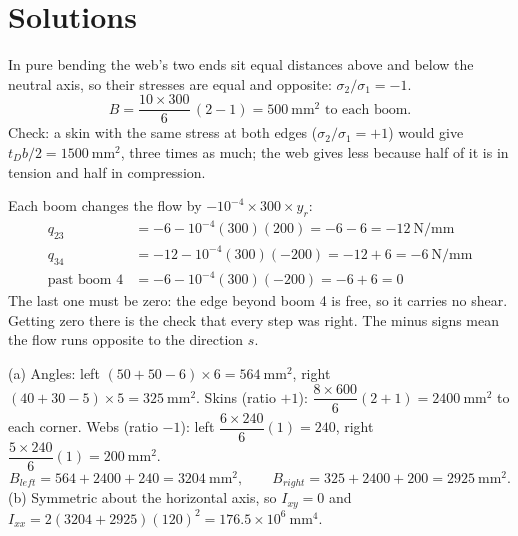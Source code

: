 \documentclass[11pt]{article}
\newcommand{\mm}{\ \mathrm{mm}}
\newcommand{\Nmm}{\ \mathrm{N/mm}}
\begin{document}
\clearpage
\section*{Solutions}\label{solutions}

In pure bending the web's two ends sit equal distances above and below the neutral axis, so their stresses are equal
and opposite: $\sigma_2/\sigma_1 = -1$.
\[ B = \frac{10\times300}{6}\,(2 - 1) = 500\mm^2 \text{ to each boom.} \]
Check: a skin with the same stress at both edges ($\sigma_2/\sigma_1 = +1$) would give $t_Db/2 = 1500\mm^2$, three
times as much; the web gives less because half of it is in tension and half in compression.

Each boom changes the flow by $-10^{-4}\times300\times y_r$:
\begin{align*}
q_{23} &= -6 - 10^{-4}(300)(200) = -6 - 6 = -12\Nmm\\
q_{34} &= -12 - 10^{-4}(300)(-200) = -12 + 6 = -6\Nmm\\
\text{past boom 4} &= -6 - 10^{-4}(300)(-200) = -6 + 6 = 0
\end{align*}
The last one must be zero: the edge beyond boom 4 is free, so it carries no shear. Getting zero there is the check that
every step was right. The minus signs mean the flow runs opposite to the direction $s$.

(a) Angles: left $(50+50-6)\times6 = 564\mm^2$, right $(40+30-5)\times5 = 325\mm^2$.
Skins (ratio $+1$): $\dfrac{8\times600}{6}(2+1) = 2400\mm^2$ to each corner.
Webs (ratio $-1$): left $\dfrac{6\times240}{6}(1) = 240$, right $\dfrac{5\times240}{6}(1) = 200\mm^2$.
\[ B_{left} = 564 + 2400 + 240 = 3204\mm^2, \qquad B_{right} = 325 + 2400 + 200 = 2925\mm^2 . \]
(b) Symmetric about the horizontal axis, so $I_{xy} = 0$ and
$I_{xx} = 2(3204 + 2925)(120)^2 = 176.5\times10^6\mm^4$.
\end{document}
